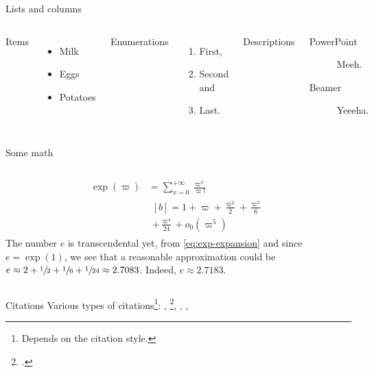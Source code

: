 \documentclass[aspectratio=169%
]{beamer}
\begin{document}
\begin{frame}{Lists and columns}
  \begin{columns}[T,onlytextwidth]
    Items
    \begin{itemize}
    \item Milk
    \item Eggs
    \item Potatoes
    \end{itemize}

    Enumerations
    \begin{enumerate}
    \item First,
    \item Second and
    \item Last.
    \end{enumerate}

    Descriptions
    \begin{description}
    \item[PowerPoint] Meeh.
    \item[Beamer] Yeeeha.
    \end{description}
  \end{columns}
\end{frame}

\begin{frame}{Some math}
  \begin{columns}[onlytextwidth]
    \begin{align}
      \exp(\varpi) & = \sum_{x=0}^{+\infty}\frac{\varpi^{x}}{\varpi!} \\
      \label{eq:exp-expansion}
                   &
                     \begin{multlined}[b]
                       = 1 + \varpi + \frac{\varpi^{2}}{2} + \frac{\varpi^{3}}{6} \\
                       + \frac{\varpi^{4}}{24}+ o_{0}(\varpi^{5})          
                     \end{multlined}
    \end{align}
    The number \(e\) is transcendental yet, from \cref{eq:exp-expansion} and since \(e=\exp(1)\), we see that a reasonable approximation could be \(e\approx 2 + \sfrac{1}{2} + \sfrac{1}{6} + \sfrac{1}{24} \approx 2.7083\). Indeed, \(e\approx2.7183\).
  \end{columns}
\end{frame}

\begin{frame}{Citations}
  Various types of citations\footnote{Depends on the citation style.}:
  \cite{Knuth92}, \footcite{ConcreteMath}, \textcite{Simpson}, , \parencite{greenwade93}
\end{frame}
\end{document}
